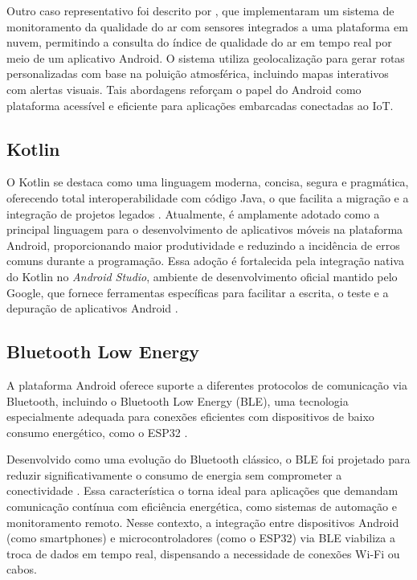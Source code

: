 Outro caso representativo foi descrito por , que implementaram um sistema de monitoramento da qualidade do ar com sensores integrados a uma plataforma em nuvem, permitindo a consulta do índice de qualidade do ar em tempo real por meio de um aplicativo Android. O sistema utiliza geolocalização para gerar rotas personalizadas com base na poluição atmosférica, incluindo mapas interativos com alertas visuais. Tais abordagens reforçam o papel do Android como plataforma acessível e eficiente para aplicações embarcadas conectadas ao IoT.

\subsection{Kotlin}

O Kotlin se destaca como uma linguagem moderna, concisa, segura e pragmática, oferecendo total interoperabilidade com código Java, o que facilita a migração e a integração de projetos legados \cite{JEMEROV2017}. Atualmente, é amplamente adotado como a principal linguagem para o desenvolvimento de aplicativos móveis na plataforma Android, proporcionando maior produtividade e reduzindo a incidência de erros comuns durante a programação. Essa adoção é fortalecida pela integração nativa do Kotlin no \textit{Android Studio}, ambiente de desenvolvimento oficial mantido pelo Google, que fornece ferramentas específicas para facilitar a escrita, o teste e a depuração de aplicativos Android \cite{ANDROIDSTUDIO}.

\subsection{Bluetooth Low Energy}

A plataforma Android oferece suporte a diferentes protocolos de comunicação via Bluetooth, incluindo o Bluetooth Low Energy (BLE), uma tecnologia especialmente adequada para conexões eficientes com dispositivos de baixo consumo energético, como o ESP32 \cite{android_bluetooth_overview}.

Desenvolvido como uma evolução do Bluetooth clássico, o BLE foi projetado para reduzir significativamente o consumo de energia sem comprometer a conectividade \cite{heydon2012bluetooth}. Essa característica o torna ideal para aplicações que demandam comunicação contínua com eficiência energética, como sistemas de automação e monitoramento remoto. Nesse contexto, a integração entre dispositivos Android (como smartphones) e microcontroladores (como o ESP32) via BLE viabiliza a troca de dados em tempo real, dispensando a necessidade de conexões Wi-Fi ou cabos.

